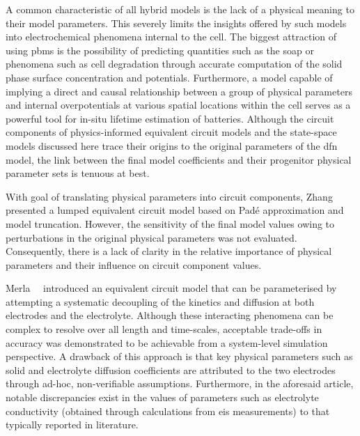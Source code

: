 A  common  characteristic  of all  hybrid  models  is  the  lack of  a  physical
meaning to  their model  parameters. This severely  limits the  insights offered
by  such  models  into  electrochemical  phenomena internal  to  the  cell.  The
biggest  attraction  of  using  \glspl{pbm} is  the  possibility  of  predicting
quantities such as the \gls{soap} or  phenomena such as cell degradation through
accurate computation  of the solid  phase surface concentration  and potentials.
Furthermore,  a model  capable  of  implying a  direct  and causal  relationship
between a  group of physical  parameters and internal overpotentials  at various
spatial locations within the cell serves as a powerful tool for in-situ lifetime
estimation  of batteries.  Although the  circuit components  of physics-informed
equivalent circuit models and the  state-space models discussed here trace their
origins to the original parameters of  the \gls{dfn} model, the link between the
final model coefficients and their progenitor physical parameter sets is tenuous
at best.


With  goal   of  translating   physical  parameters  into   circuit  components,
Zhang~\etal{}~\cite{Zhang2017} presented a lumped equivalent circuit model based
on Padé  approximation and  model truncation. However,  the sensitivity  of the
final model  values owing to  perturbations in the original  physical parameters
was not  evaluated. Consequently,  there is  a lack of  clarity in  the relative
importance  of physical  parameters  and their  influence  on circuit  component
values.


Merla~\etal{}~\cite{Merla2018} introduced  an equivalent circuit model  that can
be  parameterised by  attempting a  systematic  decoupling of  the kinetics  and
diffusion at  both electrodes  and the  electrolyte. Although  these interacting
phenomena can be complex to resolve  over all length and time-scales, acceptable
trade-offs in  accuracy was  demonstrated to be  achievable from  a system-level
simulation  perspective.  A drawback  of  this  approach  is that  key  physical
parameters such as  solid and electrolyte diffusion  coefficients are attributed
to the  two electrodes through ad-hoc,  non-verifiable assumptions. Furthermore,
in  the  aforesaid  article,  notable  discrepancies  exist  in  the  values  of
parameters such as electrolyte  conductivity (obtained through calculations from
\gls{eis} measurements)  to that typically reported  in literature.



